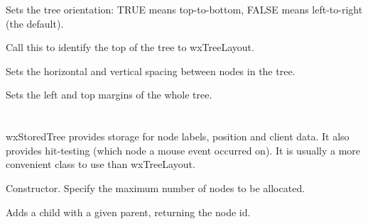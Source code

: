 

Sets the tree orientation: TRUE means top-to-bottom, FALSE means left-to-right (the default).

\label{settopnode}


Call this to identify the top of the tree to wxTreeLayout.



Sets the horizontal and vertical spacing between nodes in the tree.

\label{setmargins}


Sets the left and top margins of the whole tree.

\section{}\label{wxstoredtree}

wxStoredTree provides storage for node labels, position and client data. It also provides hit-testing
(which node a mouse event occurred on). It is usually a more convenient class to use than wxTreeLayout.






Constructor. Specify the maximum number of nodes to be allocated.

\label{wxstoredtreeaddchild}


Adds a child with a given parent, returning the node id.

\label{wxstoredtreegetclientdata}

